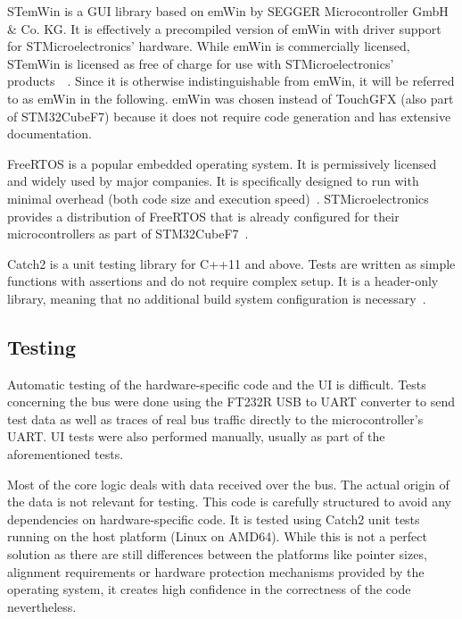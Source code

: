 STemWin is a GUI library based on emWin by SEGGER Microcontroller GmbH \& Co. KG. It is effectively
a precompiled version of emWin with driver support for STMicroelectronics' hardware. While emWin is
commercially licensed, STemWin is licensed as free of charge for use with STMicroelectronics' products~\
\cite{stm32-cube-getting-started}\cite{stemwin-release-notes}\cite{emwin-manual}. Since it is otherwise
indistinguishable from emWin, it will be referred to as emWin in the following. emWin was chosen instead
of TouchGFX (also part of STM32CubeF7) because it does not require code generation and has extensive
documentation.

FreeRTOS is a popular embedded operating system. It is permissively licensed and widely used by major
companies. It is specifically designed to run with minimal overhead (both code size and execution
speed)~\cite{freertos-about}. STMicroelectronics provides a distribution of FreeRTOS that is already
configured for their microcontrollers as part of STM32CubeF7~\cite{stm32-cube-getting-started}.

Catch2 is a unit testing library for C++11 and above. Tests are written as simple functions with
assertions and do not require complex setup. It is a header-only library, meaning that no additional
build system configuration is necessary~\cite{catch2-why}.

\subsection{Testing}
\label{implementation/software/testing}

Automatic testing of the hardware-specific code and the UI is difficult. Tests concerning the bus
were done using the FT232R USB to UART converter to send test data as well as traces of real bus
traffic directly to the microcontroller's UART. UI tests were also performed manually, usually as
part of the aforementioned tests.

Most of the core logic deals with data received over the bus. The actual origin of the data is not
relevant for testing. This code is carefully structured to avoid any dependencies on hardware-specific
code. It is tested using Catch2 unit tests running on the host platform (Linux on AMD64).
While this is not a perfect solution as there are still differences between the platforms like pointer
sizes, alignment requirements or hardware protection mechanisms provided by the operating system,
it creates high confidence in the correctness of the code nevertheless.


